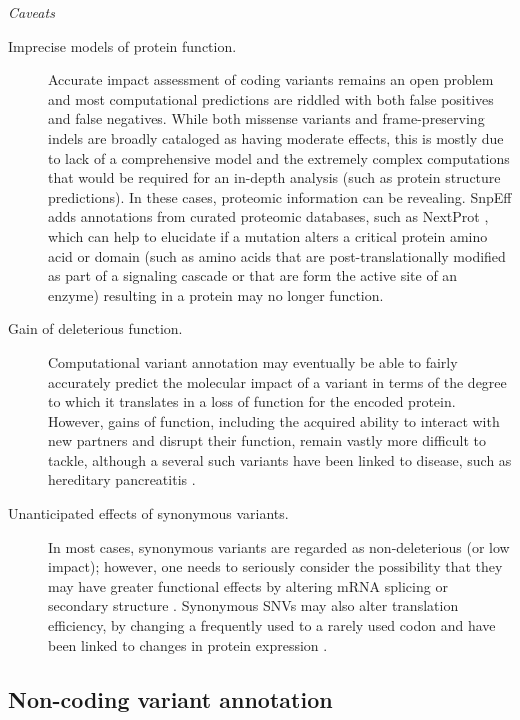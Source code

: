 	\textit{Caveats}
	
	\begin{description}
	
	\item[Imprecise models of protein function.] Accurate impact assessment of coding variants remains an open problem and most computational predictions are riddled with both false positives and false negatives. While both missense variants and frame-preserving indels are broadly cataloged as having moderate effects, this is mostly due to lack of a comprehensive model and the extremely complex computations that would be required for an in-depth analysis (such as protein structure predictions). In these cases, proteomic information can be revealing. SnpEff adds annotations from curated proteomic databases, such as NextProt  \cite{lane2012nextprot}, which can help to elucidate if a mutation alters a critical protein amino acid or domain (such as amino acids that are post-translationally modified as part of a signaling cascade or that are form the active site of an enzyme) resulting in a protein may no longer function.
	
	\item[Gain of deleterious function.] Computational variant annotation may eventually be able to fairly accurately predict the molecular impact of a variant in terms of the degree to which it translates in a loss of function for the encoded protein. However, gains of function, including the acquired ability to interact with new partners and disrupt their function, remain vastly more difficult to tackle, although a several such variants have been linked to disease, such as hereditary pancreatitis  \cite{whitcomb1996hereditary}.
	
	\item[Unanticipated effects of synonymous variants.] In most cases, synonymous variants are regarded as non-deleterious (or low impact); however, one needs to seriously consider the possibility that they may have greater functional effects by altering mRNA splicing  \cite{coulombe2009fine} or secondary structure  \cite{sabarinathan2013rnasnp}. Synonymous SNVs may also alter translation efficiency, by changing a frequently used to a rarely used codon and have been linked to changes in protein expression  \cite{sauna2011understanding}.
	
	\end{description}

\subsection{Non-coding variant annotation}

